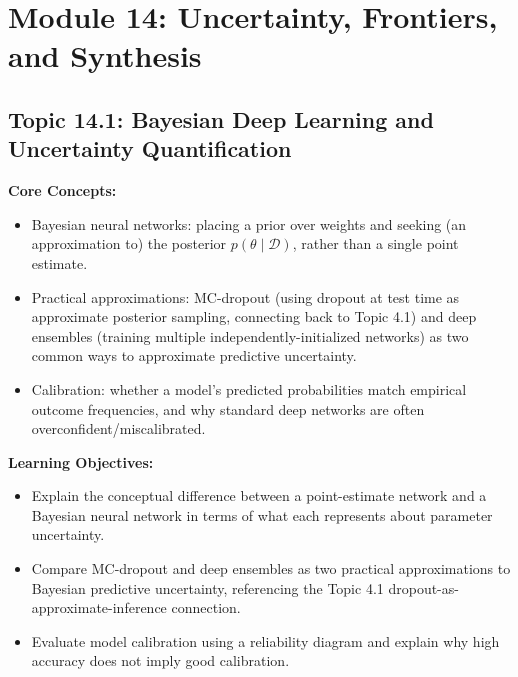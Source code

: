 \documentclass[11pt]{article}
\begin{document}
\section{Module 14: Uncertainty, Frontiers, and Synthesis}

\subsection{Topic 14.1: Bayesian Deep Learning and Uncertainty Quantification}

\textbf{Core Concepts:}
\begin{itemize}
  \item Bayesian neural networks: placing a prior over weights and seeking (an approximation to) the posterior $p(\theta\mid\mathcal D)$, rather than a single point estimate.
  \item Practical approximations: MC-dropout (using dropout at test time as approximate posterior sampling, connecting back to Topic 4.1) and deep ensembles (training multiple independently-initialized networks) as two common ways to approximate predictive uncertainty.
  \item Calibration: whether a model's predicted probabilities match empirical outcome frequencies, and why standard deep networks are often overconfident/miscalibrated.
\end{itemize}

\textbf{Learning Objectives:}
\begin{itemize}
  \item Explain the conceptual difference between a point-estimate network and a Bayesian neural network in terms of what each represents about parameter uncertainty.
  \item Compare MC-dropout and deep ensembles as two practical approximations to Bayesian predictive uncertainty, referencing the Topic 4.1 dropout-as-approximate-inference connection.
  \item Evaluate model calibration using a reliability diagram and explain why high accuracy does not imply good calibration.
\end{itemize}
\end{document}

